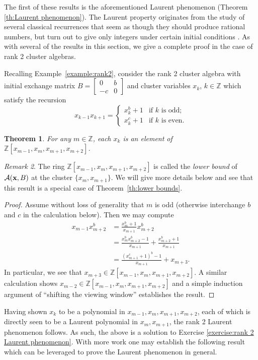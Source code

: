 \documentclass{amsart}
\newtheorem{theorem}{Theorem}[section]
\theoremstyle{definition}
\theoremstyle{remark}
\newtheorem{remark}[theorem]{Remark}
\numberwithin{equation}{section}
\newcommand{\cA}{{\mathcal{A}}}
\newcommand{\bx}{{\bf x}}
\newcommand{\ZZ}{{\mathbb{Z}}}
\begin{document}
  The first of these results is the aforementioned Laurent phenomenon (Theorem \ref{th:Laurent phenomenon}).  The Laurent property originates from the study of several classical recurrences that seem as though they should produce rational numbers, but turn out to give only integers under certain initial conditions \cite{FZ02b}.  As with several of the results in this section, we give a complete proof in the case of rank 2 cluster algebras.
	
	Recalling Example~\ref{example:rank2}, consider the rank 2 cluster algebra with initial exchange matrix $B=\left[\begin{array}{cc}0 & b\\ -c & 0\end{array}\right]$  and cluster variables $x_k$, $k\in\ZZ$ which satisfy the recursion
  \[x_{k-1}x_{k+1}=\begin{cases}x_k^b+1 & \text{if $k$ is odd;}\\ x_k^c+1 & \text{if $k$ is even.}\end{cases}\]
  \begin{theorem}
    For any $m\in\ZZ$, each $x_k$ is an element of $\ZZ[x_{m-1},x_m,x_{m+1},x_{m+2}]$.
  \end{theorem}
  \begin{remark}
    The ring $\ZZ[x_{m-1},x_m,x_{m+1},x_{m+2}]$ is called the \emph{lower bound} of $\cA(\bx,B)$ at the cluster $\{x_m,x_{m+1}\}$.  We will give more details below and see that this result is a special case of Theorem~\ref{th:lower bounds}.
  \end{remark}
  \begin{proof}
		Assume without loss of generality that $m$ is odd (otherwise interchange $b$ and $c$ in the calculation below).  Then we may compute
    \begin{align*}
      x_{m-1}x_{m+2}^b
      &=\frac{x_m^b+1}{x_{m+1}}x_{m+2}^b\\
      &=\frac{x_m^bx_{m+2}^b-1}{x_{m+1}}+\frac{x_{m+2}^b+1}{x_{m+1}}\\
      &=\frac{(x_{m+1}^c+1)^b-1}{x_{m+1}}+x_{m+3}.
    \end{align*}
    In particular, we see that $x_{m+3}\in\ZZ[x_{m-1},x_m,x_{m+1},x_{m+2}]$.  A similar calculation shows $x_{m-2}\in\ZZ[x_{m-1},x_m,x_{m+1},x_{m+2}]$ and a simple induction argument of ``shifting the viewing window'' establishes the result.
  \end{proof}
	Having shown $x_k$ to be a polynomial in $x_{m-1},x_m,x_{m+1},x_{m+2}$, each of which is directly seen to be a Laurent polynomial in $x_m, x_{m+1}$, the rank 2 Laurent phenomenon follows.  As such, the above is a solution to Exercise \ref{exercise:rank 2 Laurent phenomenon}. With more work one may establish the following result which can be leveraged to prove the Laurent phenomenon in general.
\end{document}
